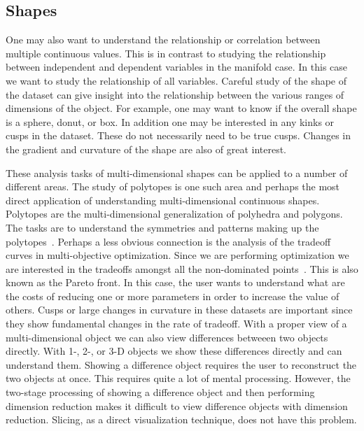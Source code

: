 \subsection{Shapes}
\label{sec:shapes}

One may also want to understand the relationship or correlation between
multiple continuous values. This is in contrast to studying the relationship
between independent and dependent variables in the manifold case. In this case
we want to study the relationship of all variables. Careful study of the shape
of the dataset can give insight into the relationship between the various
ranges of dimensions of the object. For example, one may want to know if the
overall shape is a sphere, donut, or box. In addition one may be interested in
any kinks or cusps in the dataset.  These do not necessarily need
to be true cusps. Changes in the gradient and curvature of the shape are also
of great interest.

These analysis tasks of multi-dimensional shapes can be applied to a number of
different areas. The study of polytopes is one such area and perhaps the most
direct application of understanding multi-dimensional continuous shapes.
Polytopes are the multi-dimensional generalization of polyhedra and polygons.
The tasks are to understand the symmetries and patterns making up the
polytopes~\cite{Ziegler:2012}. Perhaps a less obvious connection is the
analysis of the tradeoff curves in multi-objective optimization. Since we are
performing optimization we are interested in the tradeoffs amongst all the
non-dominated points~\cite{Kung:1975}. This is also known as the Pareto
front. In this case, the user wants to understand what are the costs of
reducing one or more parameters in order to increase the value of others. Cusps
or large changes in curvature in these datasets are important since they show
fundamental changes in the rate of tradeoff.  With a proper view of a
multi-dimensional object we can also view differences betweeen two objects
directly. With 1-, 2-, or 3-D objects we show these differences directly and
can understand them.  Showing a difference object requires the user to reconstruct
the two objects at once. This requires quite a lot of mental processing.
However, the two-stage processing of showing a difference object and then
performing dimension reduction makes it difficult to view difference objects
with dimension reduction. Slicing, as a direct visualization technique, does
not have this problem. 


